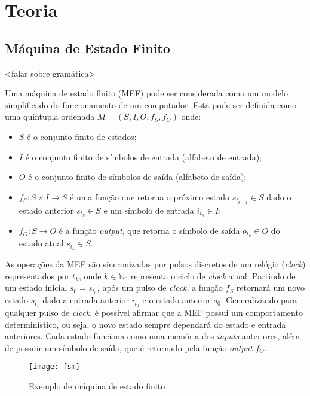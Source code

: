 \section{Teoria}

\subsection{Máquina de Estado Finito}

<falar sobre gramática>

Uma máquina de estado finito (MEF) pode ser considerada como um modelo
simplificado do funcionamento de um computador. Esta pode ser definida como uma
quíntupla ordenada $M = (S, I, O, f_S, f_O)$ onde:
\begin{itemize}
    \item $S$ é o conjunto finito de estados;
    \item $I$ é o conjunto finito de símbolos de entrada (alfabeto de entrada);
    \item $O$ é o conjunto finito de símbolos de saída (alfabeto de saída);
    \item $f_S: S \times I \rightarrow S$ é uma função que retorna o próximo
          estado $s_{t_{k+1}} \in S$ dado o estado anterior $s_{t_k} \in S$ e
          um símbolo de entrada $i_{t_k} \in I$;
    \item $f_O: S \rightarrow O$ é a função \textit{output}, que retorna o
          símbolo de saída $o_{t_k} \in O$ do estado atual $s_{t_k} \in S$.
\end{itemize}

As operações da MEF são sincronizadas por pulsos discretos de um relógio
(\textit{clock}) representados por $t_k$, onde $k \in \mathbb{N}_0$ representa o
ciclo de \textit{clock} atual. Partindo de um estado inicial $s_0 = s_{t_0}$,
após um pulso de \textit{clock}, a função $f_S$ retornará um novo estado
$s_{t_1}$ dado a entrada anterior $i_{t_0}$ e o estado anterior $s_0$.
Generalizando para qualquer pulso de \textit{clock}, é possível afirmar que a
MEF possui um comportamento determinístico, ou seja, o novo estado sempre
dependará do estado e entrada anteriores. Cada estado funciona como uma memória
dos \textit{inputs} anteriores, além de possuir um símbolo de saída, que é
retornado pela função \textit{output} $f_O$.

\begin{figure}[H]
    \centering
    \texttt{[image: fsm]}
    \caption{Exemplo de máquina de estado finito}
\end{figure}

